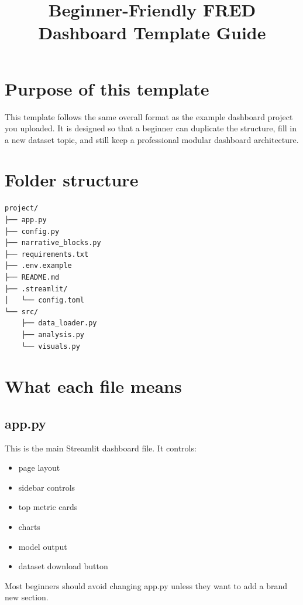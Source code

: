 \documentclass[11pt]{article}
\title{\textbf{Beginner-Friendly FRED Dashboard Template Guide}}
\author{}
\date{}
\begin{document}
\maketitle

\section{Purpose of this template}
This template follows the same overall format as the example dashboard project you uploaded.
It is designed so that a beginner can duplicate the structure, fill in a new dataset topic,
and still keep a professional modular dashboard architecture.

\section{Folder structure}
\begin{lstlisting}
project/
├── app.py
├── config.py
├── narrative_blocks.py
├── requirements.txt
├── .env.example
├── README.md
├── .streamlit/
│   └── config.toml
└── src/
    ├── data_loader.py
    ├── analysis.py
    └── visuals.py
\end{lstlisting}

\section{What each file means}

\subsection{app.py}
This is the main Streamlit dashboard file. It controls:
\begin{itemize}[leftmargin=1.5em]
  \item page layout
  \item sidebar controls
  \item top metric cards
  \item charts
  \item model output
  \item dataset download button
\end{itemize}
Most beginners should avoid changing app.py unless they want to add a brand new section.
\end{document}
